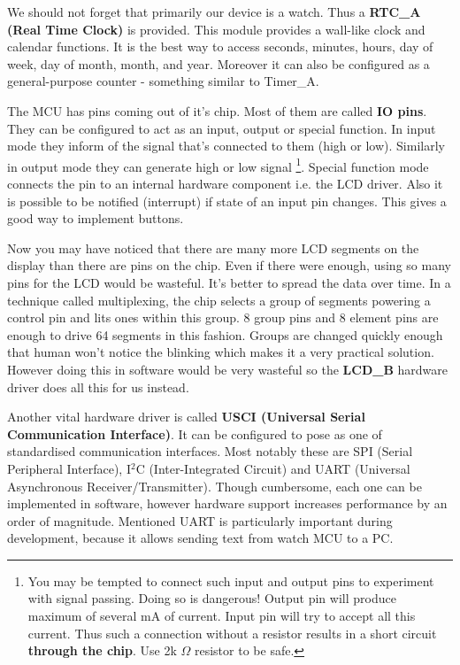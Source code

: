 We should not forget that primarily our device is a watch. Thus a {\bf
RTC\_A (Real Time Clock)} is provided. This module provides a
wall-like clock and calendar functions. It is the best way to access
seconds, minutes, hours, day of week, day of month, month, and year.
Moreover it can also be configured as a general-purpose counter -
something similar to Timer\_A.

The MCU has pins coming out of it's chip. Most of them are called {\bf
IO pins}. They can be configured to act as an input, output or special
function.  In input mode they inform of the signal that's connected to
them (high or low). Similarly in output mode they can generate high or
low signal \footnote{You may be tempted to connect such input and
output pins to experiment with signal passing. Doing so is dangerous!
Output pin will produce maximum of several mA of current. Input pin
will try to accept all this current. Thus such a connection without a
resistor results in a short circuit {\bf through the chip}. Use 2k
$\Omega$ resistor to be safe.}. Special function mode connects the pin
to an internal hardware component i.e.  the LCD driver.  Also it is
possible to be notified (interrupt) if state of an input pin changes.
This gives a good way to implement buttons.

Now you may have noticed that there are many more LCD segments on the
display than there are pins on the chip. Even if there were enough,
using so many pins for the LCD would be wasteful. It's better to
spread the data over time. In a technique called multiplexing, the
chip selects a group of segments powering a control pin and lits ones
within this group. 8 group pins and 8 element pins are enough to drive
64 segments in this fashion. Groups are changed quickly enough that human
won't notice the blinking which makes it a very practical solution.
However doing this in software would be very wasteful so the {\bf
LCD\_B} hardware driver does all this for us instead.

Another vital hardware driver is called {\bf USCI (Universal Serial
Communication Interface)}. It can be configured to pose as one of
standardised communication interfaces. Most notably these are SPI
(Serial Peripheral Interface), I$^2$C (Inter-Integrated Circuit) and
UART (Universal Asynchronous Receiver/Transmitter). Though cumbersome,
each one can be implemented in software, however hardware support
increases performance by an order of magnitude. Mentioned UART is
particularly important during development, because it allows sending
text from watch MCU to a PC.

